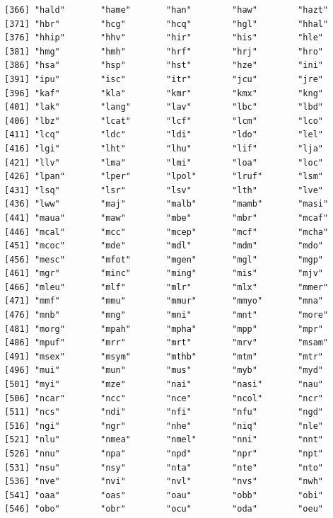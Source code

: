 \documentclass[
  letterpaper,
  DIV=11,
  numbers=noendperiod]{scrreprt}
\begin{document}
\begin{verbatim}
[366] "hald"       "hame"       "han"        "haw"        "hazt"      
[371] "hbr"        "hcg"        "hcq"        "hgl"        "hhal"      
[376] "hhip"       "hhv"        "hir"        "his"        "hle"       
[381] "hmg"        "hmh"        "hrf"        "hrj"        "hro"       
[386] "hsa"        "hsp"        "hst"        "hze"        "ini"       
[391] "ipu"        "isc"        "itr"        "jcu"        "jre"       
[396] "kaf"        "kla"        "kmr"        "kmx"        "kng"       
[401] "lak"        "lang"       "lav"        "lbc"        "lbd"       
[406] "lbz"        "lcat"       "lcf"        "lcm"        "lco"       
[411] "lcq"        "ldc"        "ldi"        "ldo"        "lel"       
[416] "lgi"        "lht"        "lhu"        "lif"        "lja"       
[421] "llv"        "lma"        "lmi"        "loa"        "loc"       
[426] "lpan"       "lper"       "lpol"       "lruf"       "lsm"       
[431] "lsq"        "lsr"        "lsv"        "lth"        "lve"       
[436] "lww"        "maj"        "malb"       "mamb"       "masi"      
[441] "maua"       "maw"        "mbe"        "mbr"        "mcaf"      
[446] "mcal"       "mcc"        "mcep"       "mcf"        "mcha"      
[451] "mcoc"       "mde"        "mdl"        "mdm"        "mdo"       
[456] "mesc"       "mfot"       "mgen"       "mgl"        "mgp"       
[461] "mgr"        "minc"       "ming"       "mis"        "mjv"       
[466] "mleu"       "mlf"        "mlr"        "mlx"        "mmer"      
[471] "mmf"        "mmu"        "mmur"       "mmyo"       "mna"       
[476] "mnb"        "mng"        "mni"        "mnt"        "more"      
[481] "morg"       "mpah"       "mpha"       "mpp"        "mpr"       
[486] "mpuf"       "mrr"        "mrt"        "mrv"        "msam"      
[491] "msex"       "msym"       "mthb"       "mtm"        "mtr"       
[496] "mui"        "mun"        "mus"        "myb"        "myd"       
[501] "myi"        "mze"        "nai"        "nasi"       "nau"       
[506] "ncar"       "ncc"        "nce"        "ncol"       "ncr"       
[511] "ncs"        "ndi"        "nfi"        "nfu"        "ngd"       
[516] "ngi"        "ngr"        "nhe"        "niq"        "nle"       
[521] "nlu"        "nmea"       "nmel"       "nni"        "nnt"       
[526] "nnu"        "npa"        "npd"        "npr"        "npt"       
[531] "nsu"        "nsy"        "nta"        "nte"        "nto"       
[536] "nve"        "nvi"        "nvl"        "nvs"        "nwh"       
[541] "oaa"        "oas"        "oau"        "obb"        "obi"       
[546] "obo"        "obr"        "ocu"        "oda"        "oeu"       

\end{verbatim}
\end{document}
